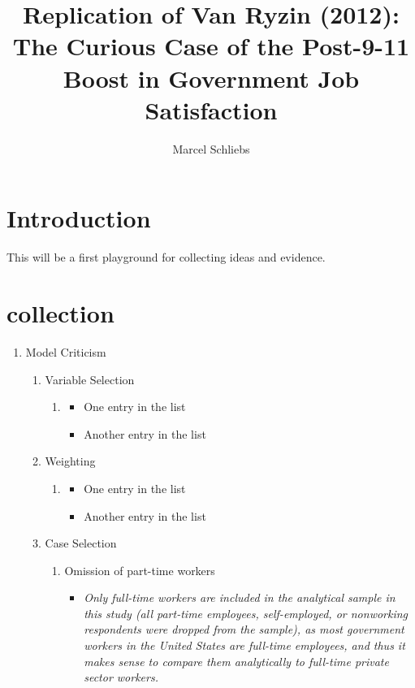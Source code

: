 \documentclass[a4paper,man,natbib]{apa6}
\title{Replication of Van Ryzin (2012): The Curious Case of the Post-9-11 Boost in Government Job Satisfaction}
\author{Marcel Schliebs}
\affiliation{Zeppelin University Friedrichshafen}
\begin{document}
\maketitle

\section{Introduction}

This will be a first playground for collecting ideas and evidence. 

\section{collection}
\label{sec:collection}

 \begin{enumerate}
	\item Model Criticism
		\begin{enumerate}
		\item Variable Selection
		\begin{enumerate}
			\item 
				\begin{itemize}
					\item One entry in the list
					\item Another entry in the list
				\end{itemize}
		\end{enumerate}
			\item Weighting
	\begin{enumerate}
		\item 
		\begin{itemize}
			\item One entry in the list
			\item Another entry in the list
		\end{itemize}
	\end{enumerate}
		\item Case Selection
		\begin{enumerate}
			\item Omission of part-time workers 
			\begin{itemize}
				\item 
				\textit{Only full-time workers are included in the analytical sample in this study (all part-time employees, self-employed, or nonworking respondents were dropped from the sample), as most government workers in the United States are full-time employees, and thus it makes sense to compare them analytically to full-time private sector workers.}

\end{itemize}
\end{enumerate}
\end{enumerate}
\end{enumerate}
\end{document}
